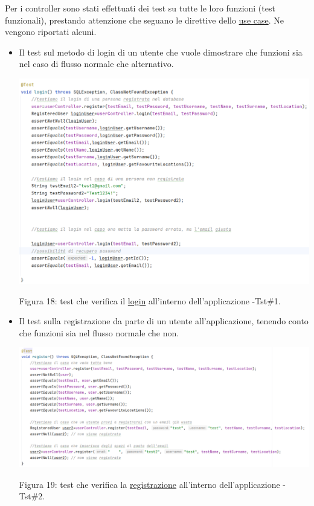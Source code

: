 \documentclass[10pt]{article}
\begin{document}
Per i controller sono stati effettuati dei test su tutte le loro funzioni (test funzionali), prestando attenzione che seguano le direttive dello \hyperref[usecase]{use case}.
Ne vengono riportati alcuni. 
\begin{itemize}
\item Il test sul metodo di login di un utente che vuole dimostrare che funzioni sia nel caso di flusso normale che alternativo.
\label{test1}
\begin{center}
\hspace*{-0.75cm}
\includegraphics[scale=0.55]{test/BusinessLogic/login}
\par
Figura 18: test che verifica il \hyperref[Usecase1]{login} all'interno dell'applicazione -Tst\#1.
\par   
\end{center}
\label{test2}
\item Il test sulla registrazione da parte di un utente all'applicazione, tenendo conto che funzioni sia nel flusso normale che non.
\begin{center}
\hspace*{-2cm}
\includegraphics[scale=0.55]{test/BusinessLogic/register}
\par
Figura 19: test che verifica la \hyperref[Usecase4]{registrazione} all'interno dell'applicazione -Tst\#2.
\par\medskip
\end{center}
\end{itemize}
\end{document}
